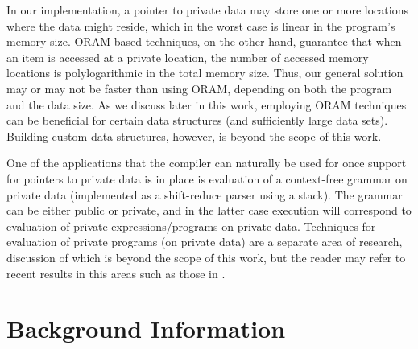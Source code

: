 \documentclass[11pt]{article}
\begin{document}
In our implementation, a pointer to private data may store one or more
locations where the data might reside, which in the worst case is linear in
the program's memory size. ORAM-based techniques, on the other hand,
guarantee that when an item is accessed at a private location, the number of
accessed memory locations is polylogarithmic in the total memory size. Thus,
our general solution may or may not be faster than using ORAM, depending on
both the program and the data size. As we discuss later in this work,
employing ORAM techniques can be beneficial for certain data structures (and
sufficiently large data sets). Building custom data structures, however, is
beyond the scope of this work. 

One of the applications that the compiler can naturally be used for
once support for pointers to private data is in place is evaluation of
a context-free grammar on private data (implemented as a shift-reduce
parser using a stack). The grammar can be either public or private,
and in the latter case execution will correspond to evaluation of
private expressions/programs on private data. Techniques for
evaluation of private programs (on private data) are a separate area
of research, discussion of which is beyond the scope of this work, but
the reader may refer to recent results in this areas such as those in
\cite{kis16,son16}.

\section{Background Information}
\label{sec:background}
\end{document}
